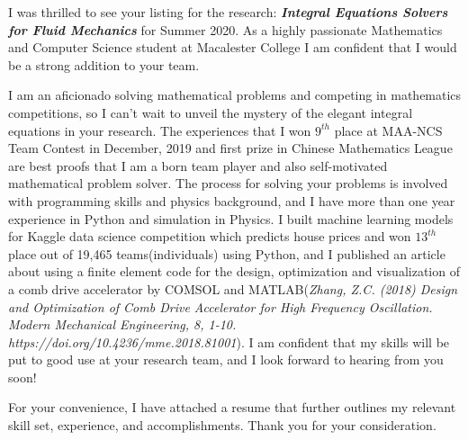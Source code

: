 \documentclass[11pt, a4paper]{awesome-cv}
\begin{document}
\makecvheader[L]


\makelettertitle

\begin{cvletter}

I was thrilled to see your listing for the research: \textit{\textbf{Integral Equations Solvers for Fluid Mechanics}} for Summer 2020. As a highly passionate Mathematics and Computer Science student at Macalester College I am confident that I would be a strong addition to your team. 

I am an aficionado solving mathematical problems and competing in mathematics competitions, so I can't wait to unveil the mystery of the elegant integral equations in your research. The experiences that I won $9^{th}$ place at MAA-NCS Team Contest in December, 2019 and first prize in Chinese Mathematics League are best proofs that I am a born team player and also self-motivated mathematical problem solver. The process for solving your problems is involved with programming skills and physics background, and I have more than one year experience in Python and simulation in Physics. I built machine learning models for Kaggle data science competition which predicts house prices and won $13^{th}$ place out of 19,465 teams(individuals) using Python, and I published an article about using a finite element code for the design, optimization and visualization of a comb drive accelerator by COMSOL and MATLAB(\textit{Zhang, Z.C. (2018) Design and Optimization of Comb Drive Accelerator for High Frequency Oscillation. Modern Mechanical Engineering, 8, 1-10. https://doi.org/10.4236/mme.2018.81001}). I am confident that my skills will be put to good use at your research team, and I look forward to hearing from you soon!


For your convenience, I have attached a resume that further outlines my relevant skill set, experience, and accomplishments. Thank you for your consideration.

\end{cvletter}


\makeletterclosing
\end{document}
